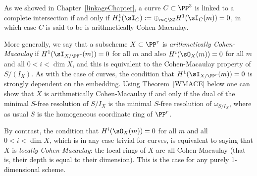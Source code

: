 As we showed in Chapter~\ref{linkageChapter}, a curve $C\subset \PP^3$ is linked to a complete intersection
if and only if  $H^1_*(\sI_C) := \oplus_{m\in \ZZ} H^1(\sI_C(m)) = 0$, in which case $C$ is said to be is arithmetically Cohen-Macaulay. 

%
%
%

More generally, we say that a subscheme $X\subset \PP^r$ is \emph{arithmetically Cohen-Macaulay}
if $H^1(\sI_{X/\PP^r}(m)) = 0$ for all $m$ and also $H^i(\sO_X(m)) = 0$ for all $m$ and all $0<i<\dim X$,
and this is equivalent to the Cohen-Macaulay property of $S/(I_X)$. As with the case of curves,
the condition that $H^1(\sI_{X/\PP^r}(m)) = 0$ 
is strongly dependent on the embedding. Using Theorem~\ref{WMACE} below one can show
that $X$ is arithmetically Cohen-Macaulay if and only if the dual of the minimal $S$-free resolution
of $S/I_X$ is the minimal $S$-free resolution of $\omega_{S/I_X}$, where as usual $S$ is the
homogeneous coordinate ring of $\PP^r$.


By contrast, the condition
that $H^i(\sO_X(m)) = 0$ for all $m$ and all $0<i<\dim X$, which is in any case trivial for curves, is 
equivalent to saying that $X$ is \emph{locally Cohen-Macaulay}: the local rings of $X$ are all Cohen-Macaulay (that is, their depth is equal to their dimension). This is the case for any purely 1-dimensional scheme. 

